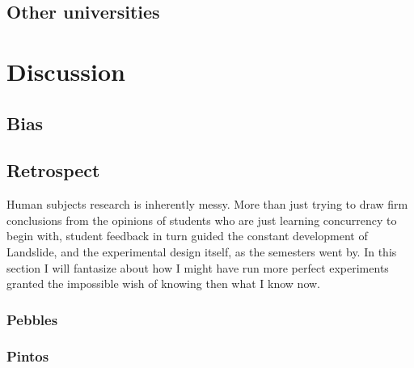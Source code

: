 \subsection{Other universities}



\section{Discussion}


\subsection{Bias}



\subsection{Retrospect}

Human subjects research is inherently messy.
More than just trying to draw firm conclusions from
the opinions of students who are just learning concurrency to begin with,
student feedback in turn guided the constant development
of Landslide, and the experimental design itself,
as the semesters went by.
In this section I will fantasize about how I might have run more perfect experiments
granted the impossible wish of knowing then what I know now.

\subsubsection{Pebbles}


\subsubsection{Pintos}

